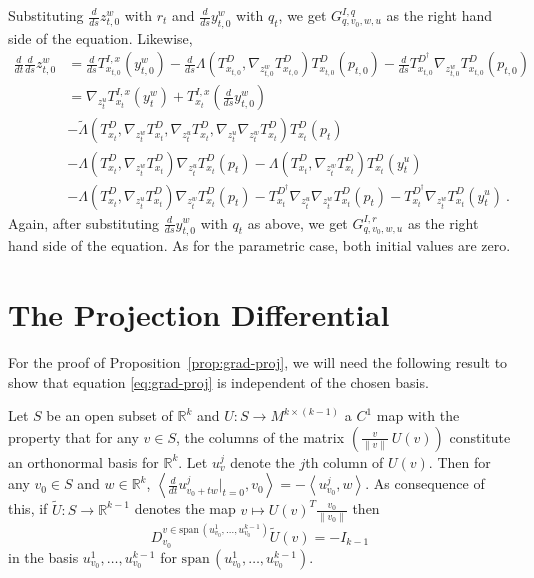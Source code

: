 \documentclass[final]{svjour3}
\newcommand{\RR}{\mathbb{R}}
\newcommand{\Span}{\mathrm{span}\,}
\newcommand{\df}[2]{\tfrac{d}{d#2} #1}
\newcommand{\ip}[1]{\left<#1\right>}
\begin{document}
    Substituting $\df{z_{t,0}^w}{s}$ with $r_t$ and $\df{y_{t,0}^w}{s}$ with $q_t$, we get
    $G_{q,v_0,w,u}^{I,q}$ as the right hand side of the equation.
    Likewise,
    \begin{align*}
        \df{\df{z_{t,0}^w}{s}}{t}
        &=
        \df{T_{x_{t,0}}^{I,x}(y^w_{t,0})}{s}
        -\df{\Lambda(T_{x_{t,0}}^D,\nabla_{z^w_{t,0}}T_{x_{t,0}}^D)T_{x_{t,0}}^D(p_{t,0})}{s}
        -\df{T_{x_{t,0}}^{D^\dagger}\nabla_{z^w_{t,0}}T_{x_{t,0}}^D(p_{t,0})}{s}
        \\
        &=
        \nabla_{z^u_t}T_{x_{t}}^{I,x}(y^w_t)
        +T_{x_{t}}^{I,x}(\df{y^w_{t,0}}{s})
        \\
        &
        -\tilde{\Lambda}(T_{x_{t}}^D,\nabla_{z^w_{t}}T_{x_{t}}^D,
        \nabla_{z^u_{t}}T_{x_{t}}^D,
        \nabla_{z^u_{t}}\nabla_{z^w_{t}}T_{x_{t}}^D)T_{x_{t}}^D(p_{t})
        \\
        &
        -\Lambda(T_{x_{t}}^D,\nabla_{z^w_{t}}T_{x_{t}}^D)\nabla_{z^u_t}T_{x_{t}}^D(p_{t})
        -\Lambda(T_{x_{t}}^D,\nabla_{z^w_{t}}T_{x_{t}}^D)T_{x_{t}}^D(y^u_{t})
        \\
        &
        -\Lambda(T_{x_{t}}^D,\nabla_{z^u_t}T_{x_{t}}^D)\nabla_{z^w_{t}}T_{x_{t}}^D(p_{t})
        -T_{x_{t}}^{D^\dagger}\nabla_{z^u_t}\nabla_{z^w_{t}}T_{x_{t}}^D(p_{t})
        -T_{x_{t}}^{D^\dagger}\nabla_{z^w_{t}}T_{x_{t}}^D(y^u_{t})
        \ .
    \end{align*}
    Again, after substituting $\df{y_{t,0}^w}{s}$ with $q_t$ as above, we get $G_{q,v_0,w,u}^{I,r}$ as the
    right hand side of the equation. As for the parametric case, both initial
    values are zero.
    

\section{The Projection Differential}
\label{app:B}
For the proof of Proposition~\ref{prop:grad-proj}, we will need the following result 
to show that equation \eqref{eq:grad-proj} is independent of the chosen basis.
\begin{lemma}
    Let $S$ be an open subset of $\RR^k$ and $U:S\rightarrow M^{k\times(k-1)}$ a $C^1$ map with the property that for any
    $v\in S$, the columns of the matrix $(\tfrac{v}{\|v\|}\ U(v))$ constitute an orthonormal basis
    for $\RR^k$. Let $u_v^j$ denote the $j$th column of $U(v)$. Then for any
    $v_0\in S$ and $w\in\RR^k$,
    $\ip{\df{u_{v_0+tw}^j|_{t=0}}{t},v_0}=-\ip{u_{v_0}^j,w}$. As consequence of
    this, if $\tilde{U}:S\rightarrow\RR^{k-1}$ denotes the map $v\mapsto U(v)^T\tfrac{v_0}{\|v_0\|}$
    then
    \begin{equation*}
        D^{v\in\Span(u_{v_0}^1,\ldots,u_{v_0}^{k-1})}_{v_0}\tilde{U}(v)=
        -I_{k-1}
\end{equation*}
    in the basis $u_{v_0}^1,\ldots,u_{v_0}^{k-1}$ for
    $\Span(u_{v_0}^1,\ldots,u_{v_0}^{k-1})$.
    
    \label{lem:orth-deriv}
\end{lemma}





\end{document}
